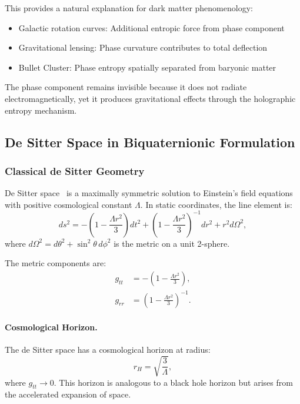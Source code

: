 This provides a natural explanation for dark matter phenomenology:
\begin{itemize}
\item Galactic rotation curves: Additional entropic force from phase component
\item Gravitational lensing: Phase curvature contributes to total deflection
\item Bullet Cluster: Phase entropy spatially separated from baryonic matter
\end{itemize}

The phase component remains invisible because it does not radiate electromagnetically, yet it produces gravitational effects through the holographic entropy mechanism.

\subsection{De Sitter Space in Biquaternionic Formulation}

\subsubsection{Classical de Sitter Geometry}

De Sitter space~\cite{deSitter1917} is a maximally symmetric solution to Einstein's field equations with positive cosmological constant $\Lambda$. In static coordinates, the line element is:
\begin{equation}
ds^2 = -\left(1 - \frac{\Lambda r^2}{3}\right)dt^2 + \left(1 - \frac{\Lambda r^2}{3}\right)^{-1}dr^2 + r^2 d\Omega^2,
\label{eq:desitter_metric}
\end{equation}
where $d\Omega^2 = d\theta^2 + \sin^2\theta \, d\phi^2$ is the metric on a unit 2-sphere.

The metric components are:
\begin{align}
g_{tt} &= -\left(1 - \frac{\Lambda r^2}{3}\right), \\
g_{rr} &= \left(1 - \frac{\Lambda r^2}{3}\right)^{-1}.
\end{align}

\paragraph{Cosmological Horizon.}
The de Sitter space has a cosmological horizon at radius:
\begin{equation}
r_H = \sqrt{\frac{3}{\Lambda}},
\end{equation}
where $g_{tt} \to 0$. This horizon is analogous to a black hole horizon but arises from the accelerated expansion of space.

